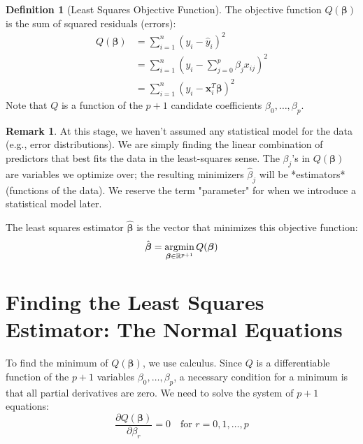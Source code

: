 \documentclass[11pt]{article}
\theoremstyle{definition}
\newtheorem{definition}[theorem]{Definition}
\newtheorem{remark}[theorem]{Remark}
\newcommand{\R}{\mathbb{R}}
\newcommand{\T}{^T} %
\newcommand{\argmin}{\operatornamewithlimits{argmin}}
\begin{document}
\begin{definition}[Least Squares Objective Function]
The objective function $Q(\boldsymbol{\beta})$ is the sum of squared residuals (errors):
\begin{align*}
Q(\boldsymbol{\beta}) &= \sum_{i=1}^{n} (y_i - \hat{y}_i)^2 \\
&= \sum_{i=1}^{n} \left( y_i - \sum_{j=0}^{p} \beta_j x_{ij} \right)^2 \\
&= \sum_{i=1}^{n} (y_i - \mathbf{x}_i\T \boldsymbol{\beta})^2
\end{align*}
Note that $Q$ is a function of the $p+1$ candidate coefficients $\beta_0, \dots, \beta_p$.
\end{definition}

\begin{remark}
At this stage, we haven't assumed any statistical model for the data (e.g., error distributions). We are simply finding the linear combination of predictors that best fits the data in the least-squares sense. The $\beta_j$'s in $Q(\boldsymbol{\beta})$ are variables we optimize over; the resulting minimizers $\hat{\beta}_j$ will be *estimators* (functions of the data). We reserve the term "parameter" for when we introduce a statistical model later.
\end{remark}

The least squares estimator $\hat{\boldsymbol{\beta}}$ is the vector that minimizes this objective function:
\[ \hat{\boldsymbol{\beta}} = \argmin_{\boldsymbol{\beta} \in \R^{p+1}} Q(\boldsymbol{\beta}) \]

\section{Finding the Least Squares Estimator: The Normal Equations}

To find the minimum of $Q(\boldsymbol{\beta})$, we use calculus. Since $Q$ is a differentiable function of the $p+1$ variables $\beta_0, \dots, \beta_p$, a necessary condition for a minimum is that all partial derivatives are zero. We need to solve the system of $p+1$ equations:
\[ \frac{\partial Q(\boldsymbol{\beta})}{\partial \beta_r} = 0 \quad \text{for } r = 0, 1, \dots, p \]
\end{document}

